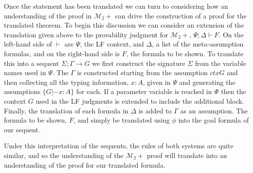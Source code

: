 \documentclass[12pt]{article}
\begin{document}
{Once the statement has been translated we can turn to considering how an understanding
of the proof in $\mathcal{M}_2+$ can drive the construction of a proof for the 
translated theorem.
%
To begin this discussion we can consider an extension of the translation given above 
to the provability judgment for $\mathcal{M}_2+$, $\Psi;\Delta\vdash F$.
%
On the left-hand side of $\vdash$ are $\Psi$, the LF context, and $\Delta$, a 
list of the meta-assumption formulas, and on the right-hand side is $F$, the 
formula to be shown.
%
To translate this into a sequent $\Sigma;\Gamma\rightarrow G$ we first construct 
the signature $\Sigma$ from the variable names used in $\Psi$.
%
The $\Gamma$ is constructed starting from the assumption $ctx G$ and then 
collecting all the typing information, $x:A$, given in $\Psi$ and generating 
the assumptions $\{G|-x:A\}$ for each.
%
If a parameter variable is reached in $\Phi$ then the context $G$ used in the 
LF judgments is extended to include the additional block.
%
Finally, the translation of each formula in $\Delta$ is added to $\Gamma$ as 
an assumption.
%
The formula to be shown, $F$, and simply be translated using $\phi$ into the 
goal formula of our sequent.

Under this interpretation of the sequents, the rules of both systems are quite
similar, and so the understanding of the $\mathcal{M}_2+$ proof will translate 
into an understanding of the proof for our translated formula.
}
\end{document}
